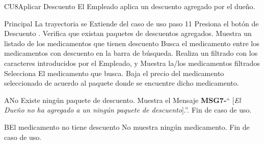 \begin{UseCase}{CU8}{Aplicar Descuento}{
		El Empleado aplica un descuento agregado por el dueño.
	}
	\end{UseCase}
	\begin{UCtrayectoria}{Principal}
		\UCpaso La trayectoria se Extiende del caso de uso  paso 11
		\UCpaso[\UCactor] Presiona el botón de Descuento .
		\UCpaso Verifica que existan paquetes de descuentos agregados.
		\UCpaso Muestra un listado de los medicamentos que tienen descuento
		\UCpaso[\UCactor] Busca el medicamento entre los medicamentos con descuento 		en la barra de búsqueda.
		\UCpaso Realiza un filtrado con los caracteres introducidos por el Empleado, y Muestra la/los medicamentos filtrados 
		\UCpaso[\UCactor] Selecciona El medicamento que busca.
		\UCpaso Baja el precio del medicamento seleccionado de acuerdo al paquete donde se encuentre dicho medicamento.
	\end{UCtrayectoria}

\begin{UCtrayectoriaA}{A}{No Existe ningún paquete de descuento.}
			\UCpaso Muestra el Mensaje {\bf MSG7-}`` [{\em El Dueño no ha agregado a un ningún paquete de descuento}].''.
			\UCpaso Fin de caso de uso.
		\end{UCtrayectoriaA}

\begin{UCtrayectoriaA}{B}{El medicamento no tiene descuento}
			\UCpaso No muestra ningún medicamento.
			\UCpaso Fin de caso de uso.
		\end{UCtrayectoriaA}
	
